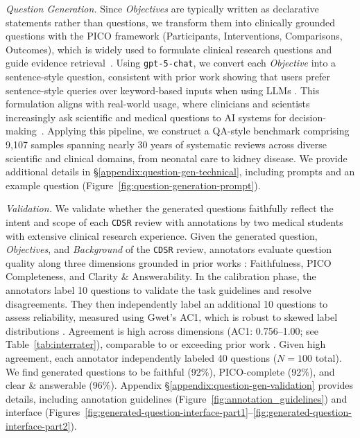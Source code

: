 \documentclass{article}
\begin{document}
\textit{Question Generation.}
Since \textit{Objectives} are typically written as declarative statements rather than questions, we transform them into clinically grounded questions with the PICO framework (Participants, Interventions, Comparisons, Outcomes), which is widely used to formulate clinical research questions and guide evidence retrieval~\cite{pico_framework}.
Using \texttt{gpt-5-chat}, we convert each \textit{Objective} into a sentence-style question, consistent with prior work showing that users prefer sentence-style queries over keyword-based inputs when using LLMs \cite{caramancion2024large, zhang2025source}. This formulation aligns with real-world usage, where clinicians and scientists increasingly ask scientific and medical questions to AI systems for decision-making~\cite{stanford_chatbot_physician_2025, goh2025gpt}. Applying this pipeline, we construct a QA-style benchmark comprising 9,107 samples spanning nearly 30 years of systematic reviews across diverse scientific and clinical domains, from neonatal care to kidney disease. 
We provide additional details in \S\ref{appendix:question-gen-technical}, including prompts and an example question (Figure~\ref{fig:question-generation-prompt}).

\textit{Validation.} We validate whether the generated questions faithfully reflect the intent and scope of each \texttt{CDSR} review with annotations by two medical students with extensive clinical research experience. Given the generated question, \textit{Objectives}, and  \textit{Background} of the \texttt{CDSR} review, annotators evaluate question quality along three dimensions grounded in prior works \cite{kaur2025whosaskingsimulatingrolebased, mir-etal-2019-evaluating, park-etal-2024-valuescope}: Faithfulness, PICO Completeness, and Clarity \& Answerability. In the calibration phase, the annotators label 10 questions to validate the task guidelines and resolve disagreements. They then independently label an additional 10 questions to assess reliability, measured using Gwet's AC1, which is robust to skewed label distributions \cite{ohyama2021statistical, wongpakaran2013comparison}. Agreement is high across dimensions (AC1: 0.756--1.00; see Table~\ref{tab:interrater}), comparable to or exceeding prior work \cite{kaur2025whosaskingsimulatingrolebased, park-etal-2024-valuescope}. Given high agreement, each annotator independently labeled 40 questions ($N=100$ total). We 
find generated questions to be faithful (92\%), PICO-complete (92\%), and clear \& answerable (96\%). Appendix \S\ref{appendix:question-gen-validation} provides details, including annotation guidelines (Figure~\ref{fig:annotation_guidelines}) and interface (Figures~\ref{fig:generated-question-interface-part1}--\ref{fig:generated-question-interface-part2}).
\end{document}

